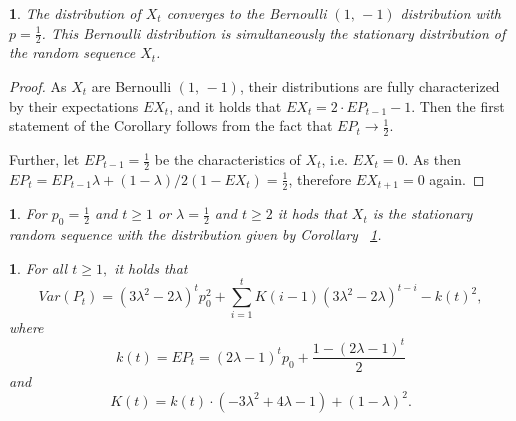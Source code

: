 \documentclass{amsart}
\theoremstyle{definition}
\theoremstyle{plain}
\newtheorem{prop}[thm]{\protect\propositionname}
\theoremstyle{plain}
\newtheorem{cor}[thm]{\protect\corollaryname}
\theoremstyle{plain}
\newtheorem{rem}[thm]{\protect\remarkname}
\numberwithin{equation}{section}
\providecommand{\corollaryname}{Corollary}
\providecommand{\propositionname}{Proposition}
\providecommand{\remarkname}{Remark}
\begin{document}
    \begin{cor}
        \label{cor-stac-dist}
        The distribution of $X_t$ converges to the Bernoulli $(1,\,-1)$ distribution with
        $p=\frac{1}{2}$.
        This Bernoulli distribution is simultaneously the stationary distribution of the random sequence $X_t$.
    \end{cor}

    \begin{proof}
        As $X_t$ are Bernoulli $(1,\,-1)$, their distributions are fully characterized by their expectations $EX_t$, and it holds that
        $EX_t=2\cdot EP_{t-1}-1$.
        Then the first statement of the Corollary follows from the fact that $EP_t\to \frac{1}{2}.$

        Further, let $EP_{t-1}=\frac{1}{2}$ be the characteristics of $X_t$, i.e.
        $EX_t=0$.
        As then
        $EP_t=EP_{t-1}\lambda+(1-\lambda)/2(1-EX_t)=\frac{1}{2}$, therefore $EX_{t+1}=0$ again.

    \end{proof}

    \begin{rem}
        For $p_0=\frac{1}{2}$ and $t\ge1$ or $\lambda = \frac{1}{2}$ and $t\ge2$ it hods that $X_t$ is the stationary
        random sequence with the distribution given by Corollary
        ~\ref{cor-stac-dist}.
    \end{rem}

    \begin{prop}
        \label{PropVarP-succes}For all $t\geq1,$ it holds that
        \begin{equation}
            Var(P_{t})=(3\lambda^{2}-2\lambda)^{t}p_{0}^{2}+\sum_{i=1}^{t}K(i-1)(3\lambda^{2}-2\lambda)^{t-i}-k(t)^{2},\label{eq:VarP-proposition}
        \end{equation}
        where
        \[
            k(t)=EP_{t}=(2\lambda-1)^{t}p_{0}+\frac{1-(2\lambda-1)^{t}}{2}
        \]
        and
        \[
            K(t)=k(t)\cdot(-3\lambda^{2}+4\lambda-1)+(1-\lambda)^{2}.
        \]
    \end{prop}
\end{document}
